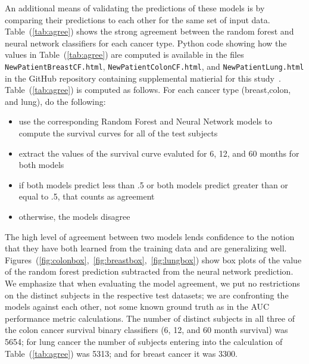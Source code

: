 \documentclass[a4paper,11pt]{article}
\newcommand{\codewhite}[1]{\colorbox{white}{\texttt{#1}}}
\begin{document}


An additional means of validating the predictions of these models is by comparing their predictions to each other for the same set of input data. 
Table~(\ref{tab:agree}) shows the strong agreement between the random forest and neural network classifiers for each cancer type. Python code showing how the values in Table~(\ref{tab:agree}) are computed is available in the files 
\codewhite{NewPatientBreastCF.html}, \codewhite{NewPatientColonCF.html}, and \codewhite{NewPatientLung.html} in the GitHub repository containing supplemental matierial for this study~\cite{supp}. Table~(\ref{tab:agree}) is computed as follows. 
For each cancer type (breast,colon, and lung), do the following:

\begin{itemize}[noitemsep]
\item use the corresponding Random Forest and Neural Network models to compute the survival curves for all of the test subjects
\item extract the values of the survival curve evaluted for 6, 12, and 60 months for both models
\item if both models predict less than .5 or both models predict greater than or equal to .5, that counts as agreement
\item otherwise, the models disagree
\end{itemize}


The high level of agreement between two models lends confidence to the notion that they have both learned from the training data and are generalizing well. Figures~(\ref{fig:colonbox},~\ref{fig:breastbox},~\ref{fig:lungbox}) 
show box plots of the value of the random forest prediction subtracted from the neural network prediction.
We emphasize that when evaluating the model agreement, we put no restrictions on the distinct subjects in the respective test datasets; we are confronting the models against each other, not some known ground truth as in the AUC performance metric calculations. The number of distinct subjects in all three of the colon cancer survival binary classifiers (6, 12, and 60 month survival) was 5654; for lung cancer the number of subjects entering into the calculation of Table~(\ref{tab:agree})
 was 5313; and for breast cancer it was 3300.
\end{document}

